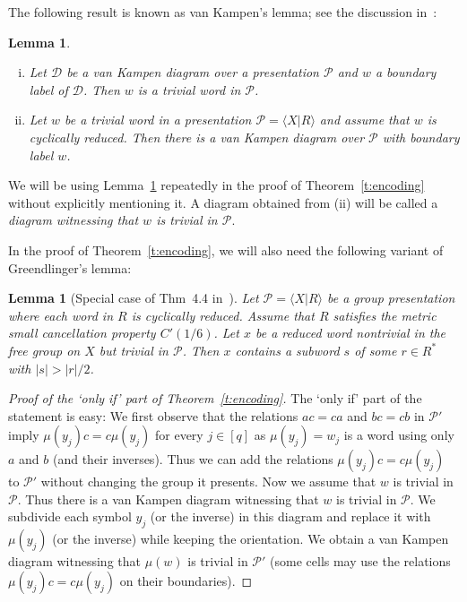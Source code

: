 \documentclass[10pt,a4paper]{article}
\newtheorem{lemma}[theorem]{Lemma}
\theoremstyle{definition}
\theoremstyle{remark}
\newcommand\DD{\mathcal{D}}
\newcommand\PP{\mathcal{P}}
\begin{document}
The following result is known as van Kampen's lemma; see the discussion
in~\cite[Ch. V.1]{lyndon-schupp77}:
\begin{lemma}
\label{l:van_Kampen}
  \begin{enumerate}[(i)]
    \item
      Let $\DD$ be a van Kampen diagram over a presentation $\PP$ and $w$ a
      boundary label of $\DD$. Then $w$ is a trivial word in $\PP$.
    \item 
      Let $w$ be a trivial word in a presentation $\PP = \langle X| R\rangle$
      and assume that $w$ is cyclically reduced. Then there is a van
      Kampen diagram over $\PP$ with boundary label $w$.  
  \end{enumerate}
\end{lemma}

We will be using Lemma~\ref{l:van_Kampen} repeatedly in the proof of
Theorem~\ref{t:encoding} without explicitly
mentioning it. A diagram obtained from (ii) will be called a \emph{diagram
witnessing that $w$ is trivial in $\PP$}.


In the proof of Theorem~\ref{t:encoding}, we will also need the following
variant of Greendlinger's lemma:

\begin{lemma}[Special case of Thm~4.4 in~\cite{lyndon-schupp77}]
\label{l:greendlinger}
Let $\PP = \langle X|R\rangle$ be a group presentation where each word in $R$
  is cyclically reduced. Assume that $R$ satisfies the metric small
  cancellation property $C'(1/6)$. Let $x$ be a reduced word nontrivial in the
    free group on $X$ but trivial in $\PP$. Then $x$ contains a subword $s$ of
    some $r \in R^*$ with $|s| > |r|/2$. 
\end{lemma}




\begin{proof}[Proof of the `only if' part of Theorem~\ref{t:encoding}]
  The `only if' part of the statement is easy: We first observe that the
  relations $ac=ca$ and $bc = cb$ in $\PP'$ imply $\mu(y_j)c = c\mu(y_j)$ for
  every $j \in [q]$ as $\mu(y_j) = w_j$ is a word using only $a$ and $b$ (and
  their inverses). Thus we can add the relations $\mu(y_j)c = c\mu(y_j)$ to
  $\PP'$ without changing the group it presents. Now we assume that $w$ is
  trivial in $\PP$. Thus there is a van Kampen diagram witnessing that $w$ is
  trivial in $\PP$. We subdivide each symbol $y_j$ (or the inverse) in this
  diagram and replace it with $\mu(y_j)$ (or the inverse) while keeping the
	orientation. We obtain a van Kampen diagram witnessing that $\mu(w)$ is trivial in
  $\PP'$ (some cells may use the relations $\mu(y_j)c = c\mu(y_j)$ on their
  boundaries).
\end{proof}
\end{document}
